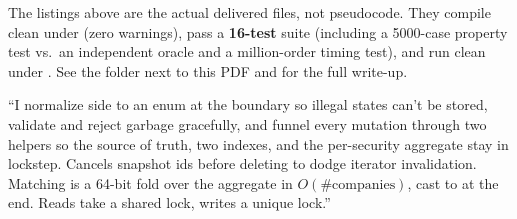 \begin{keybox}
The listings above are the actual delivered files, not pseudocode. They compile
clean under  (zero warnings), pass a
\textbf{16-test} suite (including a 5000-case property test vs.\ an independent
oracle and a million-order timing test), and run clean under
. See the  folder next to this
PDF and  for the full write-up.
\end{keybox}

\begin{say}
``I normalize side to an enum at the boundary so illegal states can't be stored,
validate and reject garbage gracefully, and funnel every mutation through two
helpers so the source of truth, two indexes, and the per-security aggregate stay
in lockstep. Cancels snapshot ids before deleting to dodge iterator
invalidation. Matching is a 64-bit fold over the aggregate in $O(\#\text{companies})$,
cast to  at the end. Reads take a shared lock, writes a unique
lock.''
\end{say}

